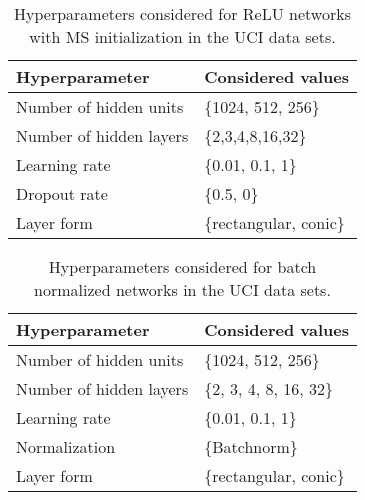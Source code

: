 \documentclass{article}
\begin{document}
\begin{table}[htp]
\begin{center}
\caption[Hyperparameters considered for ReLU networks in the UCI data sets.]{Hyperparameters considered for ReLU networks with MS initialization in the UCI data sets.}

\begin{tabular}{ll}
\toprule
Hyperparameter  & Considered values \\ 
\midrule
   Number of hidden units & \{1024, 512, 256\} \\
  Number of hidden layers & \{2,3,4,8,16,32\} \\
  Learning rate & \{0.01, 0.1, 1\} \\
  Dropout rate & \{0.5, 0\}\\
  Layer form & \{rectangular, conic\} \\
\bottomrule
\end{tabular}
\end{center}

\end{table}





\begin{table}[htp]
\begin{center}
\caption{Hyperparameters considered for batch normalized networks in the UCI data sets.}

\begin{tabular}{ll}
\toprule
Hyperparameter  & Considered values \\ 
\midrule
  Number of hidden units & \{1024, 512, 256\} \\
  Number of hidden layers & \{2, 3, 4, 8, 16, 32\} \\
  Learning rate & \{0.01, 0.1, 1\} \\
  Normalization & \{Batchnorm\} \\
  Layer form & \{rectangular, conic\} \\
\bottomrule
\end{tabular}
\end{center}

\end{table}
\end{document}
